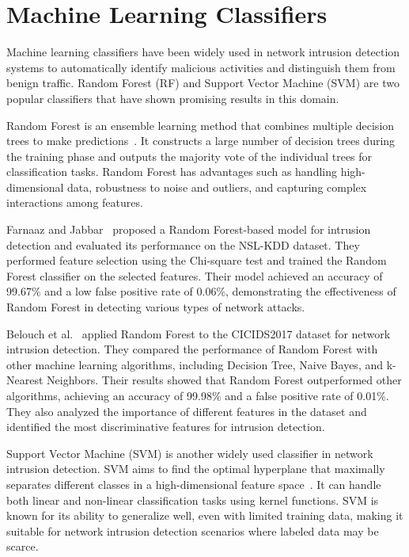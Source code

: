 \section{Machine Learning Classifiers}\label{sec:classifiers}

Machine learning classifiers have been widely used in network intrusion detection systems to automatically identify malicious activities and distinguish them from benign traffic. Random Forest (RF) and Support Vector Machine (SVM) are two popular classifiers that have shown promising results in this domain.

Random Forest is an ensemble learning method that combines multiple decision trees to make predictions~\cite{hastie2009random}. It constructs a large number of decision trees during the training phase and outputs the majority vote of the individual trees for classification tasks. Random Forest has advantages such as handling high-dimensional data, robustness to noise and outliers, and capturing complex interactions among features.

Farnaaz and Jabbar~\cite{farnaaz2016random} proposed a Random Forest-based model for intrusion detection and evaluated its performance on the NSL-KDD dataset. They performed feature selection using the Chi-square test and trained the Random Forest classifier on the selected features. Their model achieved an accuracy of 99.67\% and a low false positive rate of 0.06\%, demonstrating the effectiveness of Random Forest in detecting various types of network attacks.

Belouch et al.~\cite{belouch2018performance} applied Random Forest to the CICIDS2017 dataset for network intrusion detection. They compared the performance of Random Forest with other machine learning algorithms, including Decision Tree, Naive Bayes, and k-Nearest Neighbors. Their results showed that Random Forest outperformed other algorithms, achieving an accuracy of 99.98\% and a false positive rate of 0.01\%. They also analyzed the importance of different features in the dataset and identified the most discriminative features for intrusion detection.

Support Vector Machine (SVM) is another widely used classifier in network intrusion detection. SVM aims to find the optimal hyperplane that maximally separates different classes in a high-dimensional feature space~\cite{cortes1995support}. It can handle both linear and non-linear classification tasks using kernel functions. SVM is known for its ability to generalize well, even with limited training data, making it suitable for network intrusion detection scenarios where labeled data may be scarce.

